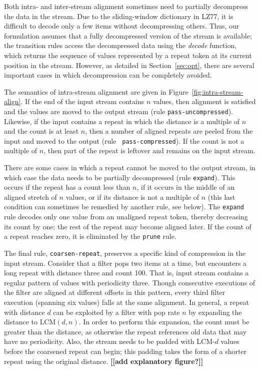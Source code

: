 Both intra- and inter-stream alignment sometimes need to partially
decompress the data in the stream.  Due to the sliding-window
dictionary in LZ77, it is difficult to decode only a few items without
decompressing others.  Thus, our formulation assumes that a fully
decompressed version of the stream is available; the transition rules
access the decompressed data using the \mbox{\it decode} function,
which returns the sequence of values represented by a repeat token at
its current position in the stream.  However, as detailed in
Section~\ref{sec:opt}, there are several important cases in which
decompression can be completely avoided.

The semantics of intra-stream alignment are given in
Figure~\ref{fig:intra-stream-align}.  If the end of the input stream
contains $n$ values, then alignment is satisfied and the values are
moved to the output stream (rule {\tt pass-uncompressed}).  Likewise,
if the input contains a repeat in which the distance is a multiple of
$n$ and the count is at least $n$, then a number of aligned repeats
are peeled from the input and moved to the output (rule {\tt
pass-compressed}).  If the count is not a multiple of $n$, then part
of the repeat is leftover and remains on the input stream.

There are some cases in which a repeat cannot be moved to the output
stream, in which case the data needs to be partially decompressed
(rule {\tt expand}).  This occurs if the repeat has a count less than
$n$, if it occurs in the middle of an aligned stretch of $n$ values,
or if its distance is not a multiple of $n$ (this last condition can
sometimes be remedied by another rule, see below).  The {\tt expand}
rule decodes only one value from an unaligned repeat token, thereby
decreasing its count by one; the rest of the repeat may become aligned
later.  If the count of a repeat reaches zero, it is eliminated by the
{\tt prune} rule.

The final rule, {\tt coarsen-repeat}, preserves a specific kind of
compression in the input stream.  Consider that a filter pops two
items at a time, but encounters a long repeat with distance three and
count 100.  That is, input stream contains a regular pattern of values
with periodicity three.  Though consecutive executions of the filter
are aligned at different offsets in this pattern, every third filter
execution (spanning six values) falls at the same alignment.  In
general, a repeat with distance $d$ can be exploited by a filter with
pop rate $n$ by expanding the distance to $\mbox{LCM}(d, n)$.  In
order to perform this expansion, the count must be greater than the
distance, as otherwise the repeat references old data that may have no
periodicity.  Also, the stream needs to be padded with LCM-$d$ values
before the coarsened repeat can begin; this padding takes the form of
a shorter repeat using the original distance.  
{\bf [[add explanatory figure?]]}

